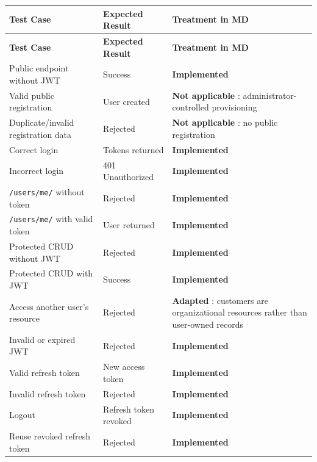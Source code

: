 \documentclass[11pt,a4paper]{article}
\newcommand{\implemented}{
    \textcolor{okgreen}{\textbf{Implemented}}
}
\newcommand{\adapted}{
    \textcolor{warnorange}{\textbf{Adapted}}
}
\newcommand{\notapplicable}{
    \textcolor{nogray}{\textbf{Not applicable}}
}
\begin{document}
\begin{longtable}{p{} p{} p{}}
\toprule
\textbf{Test Case} & \textbf{Expected Result} & \textbf{Treatment in MD} \\
\midrule
\endfirsthead

\toprule
\textbf{Test Case} & \textbf{Expected Result} & \textbf{Treatment in MD} \\
\midrule
\endhead

Public endpoint without JWT & Success & \implemented \\

Valid public registration & User created & \notapplicable: administrator-controlled provisioning \\

Duplicate/invalid registration data & Rejected & \notapplicable: no public registration \\

Correct login & Tokens returned & \implemented \\

Incorrect login & 401 Unauthorized & \implemented \\

\texttt{/users/me/} without token & Rejected & \implemented \\

\texttt{/users/me/} with valid token & User returned & \implemented \\

Protected CRUD without JWT & Rejected & \implemented \\

Protected CRUD with JWT & Success & \implemented \\

Access another user's resource & Rejected & \adapted: customers are organizational resources rather than user-owned records \\

Invalid or expired JWT & Rejected & \implemented \\

Valid refresh token & New access token & \implemented \\

Invalid refresh token & Rejected & \implemented \\

Logout & Refresh token revoked & \implemented \\

Reuse revoked refresh token & Rejected & \implemented \\


\end{longtable}
\end{document}

